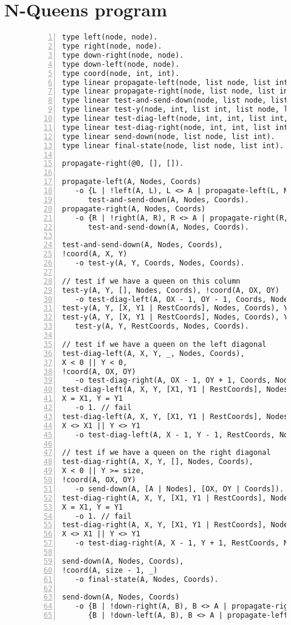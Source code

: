 
\section{N-Queens program}\label{code:nqueens}

\begin{figure}[h!]
\scriptsize\begin{Verbatim}[numbers=left]
type left(node, node).
type right(node, node).
type down-right(node, node).
type down-left(node, node).
type coord(node, int, int).
type linear propagate-left(node, list node, list int).
type linear propagate-right(node, list node, list int).
type linear test-and-send-down(node, list node, list int).
type linear test-y(node, int, list int, list node, list int).
type linear test-diag-left(node, int, int, list int, list node, list int).
type linear test-diag-right(node, int, int, list int, list node, list int).
type linear send-down(node, list node, list int).
type linear final-state(node, list node, list int).

propagate-right(@0, [], []).

propagate-left(A, Nodes, Coords)
   -o {L | !left(A, L), L <> A | propagate-left(L, Nodes, Coords)},
      test-and-send-down(A, Nodes, Coords).
propagate-right(A, Nodes, Coords)
   -o {R | !right(A, R), R <> A | propagate-right(R, Nodes, Coords)},
      test-and-send-down(A, Nodes, Coords).

test-and-send-down(A, Nodes, Coords),
!coord(A, X, Y)
   -o test-y(A, Y, Coords, Nodes, Coords).

// test if we have a queen on this column
test-y(A, Y, [], Nodes, Coords), !coord(A, OX, OY)
   -o test-diag-left(A, OX - 1, OY - 1, Coords, Nodes, Coords).
test-y(A, Y, [X, Y1 | RestCoords], Nodes, Coords), Y = Y1 -o 1. // fail
test-y(A, Y, [X, Y1 | RestCoords], Nodes, Coords), Y <> Y1 -o
   test-y(A, Y, RestCoords, Nodes, Coords).

// test if we have a queen on the left diagonal
test-diag-left(A, X, Y, _, Nodes, Coords),
X < 0 || Y < 0,
!coord(A, OX, OY)
   -o test-diag-right(A, OX - 1, OY + 1, Coords, Nodes, Coords).
test-diag-left(A, X, Y, [X1, Y1 | RestCoords], Nodes, Coords),
X = X1, Y = Y1
   -o 1. // fail
test-diag-left(A, X, Y, [X1, Y1 | RestCoords], Nodes, Coords),
X <> X1 || Y <> Y1
   -o test-diag-left(A, X - 1, Y - 1, RestCoords, Nodes, Coords).

// test if we have a queen on the right diagonal
test-diag-right(A, X, Y, [], Nodes, Coords),
X < 0 || Y >= size,
!coord(A, OX, OY)
   -o send-down(A, [A | Nodes], [OX, OY | Coords]). // add new queen
test-diag-right(A, X, Y, [X1, Y1 | RestCoords], Nodes, Coords),
X = X1, Y = Y1
   -o 1. // fail
test-diag-right(A, X, Y, [X1, Y1 | RestCoords], Nodes, Coords),
X <> X1 || Y <> Y1
   -o test-diag-right(A, X - 1, Y + 1, RestCoords, Nodes, Coords).

send-down(A, Nodes, Coords),
!coord(A, size - 1, _)
   -o final-state(A, Nodes, Coords).

send-down(A, Nodes, Coords)
   -o {B | !down-right(A, B), B <> A | propagate-right(B, Nodes, Coords)},
      {B | !down-left(A, B), B <> A | propagate-left(B, Nodes, Coords)}.
\end{Verbatim}
\end{figure}
\normalsize

